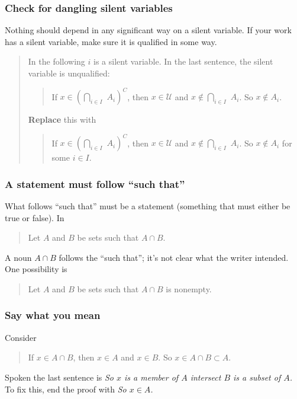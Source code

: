 \documentclass[12pt]{article}
\newcounter{ex}\setcounter{ex}{0}
\newcounter{id}\setcounter{id}{0}
\newcounter{se}\setcounter{se}{0}
\begin{document}
 \subsubsection{ Check for dangling silent variables}

Nothing should depend in any significant way on a  silent variable. If your
work has a  silent variable, make sure it is qualified in some way.


\begin{quote}
In the following \(i\) is a  silent variable. In the last sentence, the
 silent variable is unqualified:
\begin{quote}
If \(x \in \left(\underset{i \in I}{\bigcap} \,\, A_i \right)^C\), then
\(x \in \mathcal{U}\) and \(x \notin \underset{i \in I}{\bigcap} \,\, A_i\).
So \(x \notin A_i\).
\end{quote}
\textbf{Replace} this with
\begin{quote}
If \(x \in \left(\underset{i \in I}{\bigcap} \,\, A_i \right)^C\), then
\(x \in \mathcal{U}\) and \(x \notin \underset{i \in I}{\bigcap} \,\, A_i\).
So \(x \notin A_i\) for some \(i \in I\).
\end{quote}
\end{quote}

 \subsubsection{ A statement must follow ``such that'' }

What follows ``such that'' must be a statement (something that must either
be true or false).  In 

\begin{quote}
Let \(A\) and \(B\) be sets such that \(A \cap B\).
\end{quote}
A noun \(A \cap B\) follows the ``such that''; it's not clear what the writer intended.
One possibility is 
\begin{quote}
Let \(A\) and \(B\) be sets such that \(A \cap B\) is nonempty.
\end{quote}

 \subsubsection{ Say what you mean}

Consider
\begin{quote}
If \(x \in A \cap B\), then \(x \in A\) and \(x \in B\). So
\(x \in A \cap B \subset A\).
\end{quote}
Spoken the last sentence is 
 \emph{So \(x\) is a member of \(A\) intersect \(B\) is a subset of \(A\).} To fix this,
end the proof with \emph{So \(x \in A\).}
\end{document}
